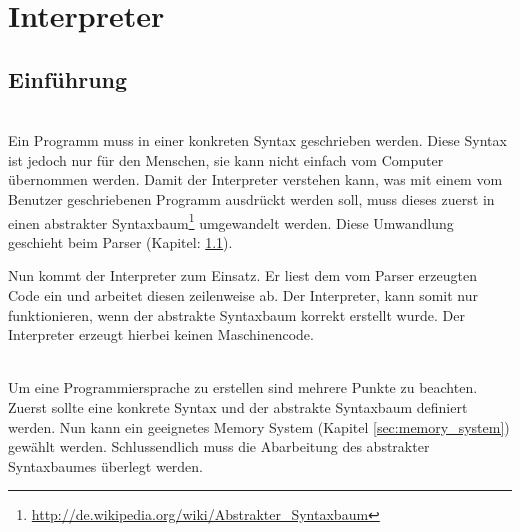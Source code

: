 

\chapter{Interpreter}

\section{Einführung}




\\
Ein Programm muss in einer konkreten Syntax geschrieben werden. Diese Syntax ist jedoch nur für den Menschen, sie kann nicht einfach vom Computer übernommen werden. Damit der Interpreter verstehen kann, was mit einem vom Benutzer geschriebenen Programm ausdrückt werden soll, muss dieses zuerst in einen abstrakter Syntaxbaum\footnote{\url{http://de.wikipedia.org/wiki/Abstrakter_Syntaxbaum}} umgewandelt werden. Diese Umwandlung geschieht beim Parser (Kapitel: \ref{}).

Nun kommt der Interpreter zum Einsatz. Er liest dem vom Parser erzeugten Code ein und arbeitet diesen zeilenweise ab. Der Interpreter, kann somit nur funktionieren, wenn der abstrakte Syntaxbaum korrekt erstellt wurde. Der Interpreter erzeugt hierbei keinen Maschinencode.

\\
Um eine Programmiersprache zu erstellen sind mehrere Punkte zu beachten. Zuerst sollte eine konkrete Syntax und der abstrakte Syntaxbaum definiert werden. Nun kann ein geeignetes Memory System (Kapitel \ref{sec:memory_system}) gewählt werden. Schlussendlich muss die Abarbeitung des abstrakter Syntaxbaumes überlegt werden.

